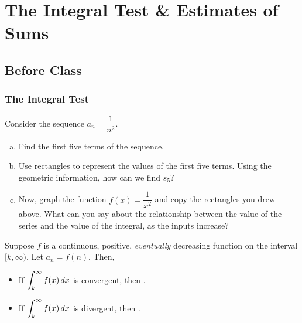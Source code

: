 \documentclass[notes]{subfiles}
\begin{document}
	\fancyhead[LO,RE]{\bfseries \small \currentname}
	\fancyfoot[C]{{}}
	\fancyfoot[RO,LE]{\large \thepage}	%
	
\section*{The Integral Test \& Estimates of Sums}\label{cs113}
	\subsection*{Before Class}
	\subsubsection*{The Integral Test}
		\begin{ex}
			Consider the sequence $a_n = \dfrac{1}{n^2}$.
			\begin{enumerate}[(a)]
				\item Find the first five terms of the sequence.
				\item Use rectangles to represent the values of the first five terms.  Using the geometric information, how can we find $s_5$?
				\item Now, graph the function $f(x) = \dfrac{1}{x^2}$ and copy the rectangles you drew above.  What can you say about the relationship between the value of the series and the value of the integral, as the inputs increase?
			\end{enumerate}
		\end{ex}
			\newpage
			
		\begin{rmk}
			Suppose $f$ is a continuous, positive, \emph{eventually} decreasing function on the interval $[k,\infty)$.  Let $a_n = f(n)$.  Then,\\
			\begin{itemize}
				\setlength \itemsep{20pt}
				
				\item If $\displaystyle \int_k^\infty f(x)\, dx$ is convergent, then .
				\item If $\displaystyle \int_k^\infty f(x)\, dx$ is divergent, then .
			\end{itemize}
		\end{rmk}
		
\end{document}
